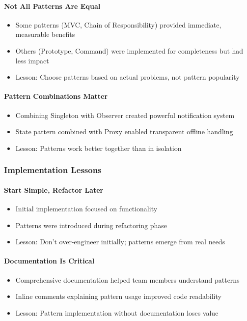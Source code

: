 \documentclass[11pt, a4paper]{article}
\theoremstyle{plain}
\theoremstyle{definition}
\begin{document}
\paragraph{Not All Patterns Are Equal}
\begin{itemize}
    \item Some patterns (MVC, Chain of Responsibility) provided immediate, measurable benefits
    \item Others (Prototype, Command) were implemented for completeness but had less impact
    \item Lesson: Choose patterns based on actual problems, not pattern popularity
\end{itemize}

\paragraph{Pattern Combinations Matter}
\begin{itemize}
    \item Combining Singleton with Observer created powerful notification system
    \item State pattern combined with Proxy enabled transparent offline handling
    \item Lesson: Patterns work better together than in isolation
\end{itemize}

\subsubsection{Implementation Lessons}

\paragraph{Start Simple, Refactor Later}
\begin{itemize}
    \item Initial implementation focused on functionality
    \item Patterns were introduced during refactoring phase
    \item Lesson: Don't over-engineer initially; patterns emerge from real needs
\end{itemize}

\paragraph{Documentation Is Critical}
\begin{itemize}
    \item Comprehensive documentation helped team members understand patterns
    \item Inline comments explaining pattern usage improved code readability
    \item Lesson: Pattern implementation without documentation loses value
\end{itemize}
\end{document}
